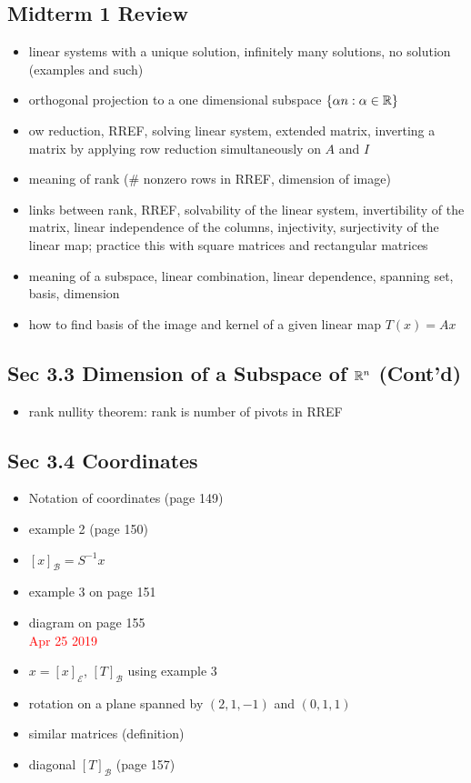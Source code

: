 \documentclass[12pt,a4paper]{article}
\newcommand{\red}[1]{\textcolor{red}{#1}}
\def\R{\ifmmode\mathbb R\fi}
\begin{document}
\subsection*{Midterm 1 Review}
\begin{itemize}
    \item linear systems with a unique solution, infinitely many solutions, no solution (examples and such)
    \item orthogonal projection to a one dimensional subspace $\{\alpha n: \alpha \in \R\}$ 
    \item ow reduction, RREF, solving linear system, extended matrix, inverting a matrix by applying row reduction simultaneously on $A$ and $I$
    \item meaning of rank (\# nonzero rows in RREF, dimension of image)
    \item links between rank, RREF, solvability of the linear system, invertibility of the matrix, linear independence of the columns, injectivity, surjectivity of the linear map; practice this with square matrices and rectangular matrices
    \item meaning of a subspace, linear combination, linear dependence, spanning set, basis, dimension
    \item how to find basis of the image and kernel of a given linear map $T(x) = Ax$
\end{itemize}


\subsection*{Sec 3.3 Dimension of a Subspace of $\R^n$ (Cont'd)}
\begin{itemize}
    \item rank nullity theorem: rank is number of pivots in RREF
\end{itemize}

\subsection*{Sec 3.4 Coordinates}
\begin{itemize}
    \item Notation of coordinates (page 149)
    \item example 2 (page 150)
    \item $[x]_{\mathcal B} = S^{-1}x$
    \item example 3 on page 151
    \item diagram on page 155
\red{\\Apr 25 2019}
    \item $x = [x]_{\mathcal E}$, $[T]_{\mathcal B}$ using example 3
    \item rotation on a plane spanned by $(2, 1, -1)$ and $(0, 1, 1)$
    \item similar matrices (definition)
    \item diagonal $[T]_{\mathcal B}$ (page 157)
\end{itemize}
\end{document}
